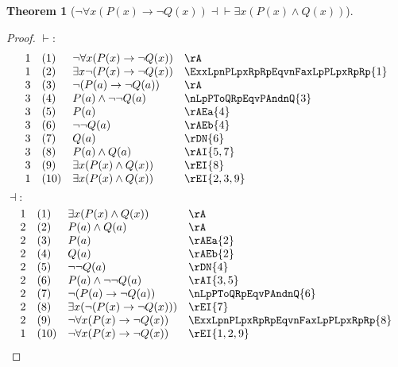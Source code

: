 \documentclass{book}
\theoremstyle{plain}
\newtheorem{theorem}{Theorem}
\theoremstyle{remark}
\theoremstyle{definition}
\begin{document}
\label{LpnFaxLpPLpxRpTonQLpxRpRpEqvExxLpPLpxRpAndQLpxRpRp}
\begin{theorem}[\(\neg\forall x(P(x)\rightarrow \neg Q(x)) \dashv\vdash \exists x (P(x)\land  Q(x))\)]
\end{theorem}
\begin{proof}
	\(\vdash:\)
	\[
	\begin{array}{llll}
		1 & (1) & \neg\forall x(P(x)\rightarrow \neg Q(x)) & \rA \\
		1 & (2) & \exists x \neg (P(x)\rightarrow \neg Q(x)) & \ExxLpnPLpxRpRpEqvnFaxLpPLpxRpRp{1} \\
		3 & (3) & \neg (P(a)\rightarrow \neg Q(a)) & \rA \\
		3 & (4) & P(a)\land \neg\neg Q(a) &  \nLpPToQRpEqvPAndnQ{3} \\
		3 & (5) & P(a) & \rAEa{4} \\
		3 & (6) & \neg\neg Q(a) & \rAEb{4} \\
		3 & (7) & Q(a) & \rDN{6} \\
		3 & (8) & P(a)\land Q(a) & \rAI{5,7} \\
		3 & (9) & \exists x(P(x)\land Q(x)) & \rEI{8} \\
		1 & (10) & \exists x(P(x)\land Q(x)) & \rEI{2,3,9} \\
	\end{array}
	\]
	\(\dashv:\)
	\[
	\begin{array}{llll}
		1 & (1) & \exists x (P(x)\wedge Q(x)) & \rA \\
		2 & (2) & P(a)\wedge Q(a) & \rA \\
		2 & (3) & P(a) & \rAEa{2} \\
		2 & (4) & Q(a) & \rAEb{2} \\
		2 & (5) & \neg\neg Q(a) & \rDN{4} \\
		2 & (6) & P(a)\land \neg\neg Q(a) & \rAI{3,5} \\
		2 & (7) & \neg(P(a)\rightarrow \neg Q(a)) & \nLpPToQRpEqvPAndnQ{6} \\
		2 & (8) & \exists x(\neg(P(x)\rightarrow \neg Q(x))) & \rEI{7} \\
		2 & (9) & \neg\forall x(P(x)\rightarrow \neg Q(x)) & \ExxLpnPLpxRpRpEqvnFaxLpPLpxRpRp{8} \\
		1 & (10) & \neg\forall x(P(x)\rightarrow \neg Q(x)) & \rEI{1,2,9} \\
	\end{array}
	\]
\end{proof}
\end{document}
